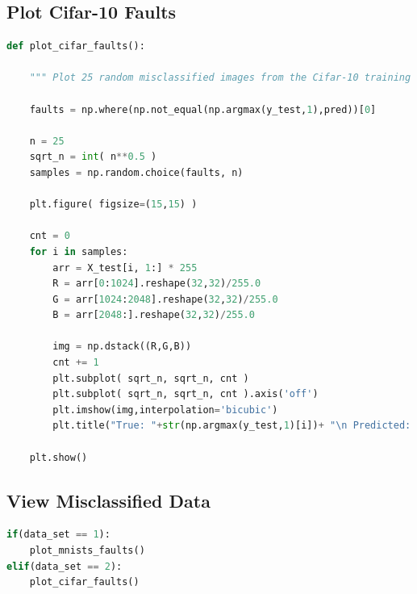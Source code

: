 \documentclass[11pt]{article}
\begin{document}
\subsection{Plot Cifar-10 Faults}
\begin{lstlisting}[language = Python]
def plot_cifar_faults():
    
    """ Plot 25 random misclassified images from the Cifar-10 training set. """  
    
    faults = np.where(np.not_equal(np.argmax(y_test,1),pred))[0]

    n = 25
    sqrt_n = int( n**0.5 )
    samples = np.random.choice(faults, n)

    plt.figure( figsize=(15,15) )

    cnt = 0
    for i in samples:
        arr = X_test[i, 1:] * 255
        R = arr[0:1024].reshape(32,32)/255.0
        G = arr[1024:2048].reshape(32,32)/255.0
        B = arr[2048:].reshape(32,32)/255.0

        img = np.dstack((R,G,B))
        cnt += 1
        plt.subplot( sqrt_n, sqrt_n, cnt )
        plt.subplot( sqrt_n, sqrt_n, cnt ).axis('off')
        plt.imshow(img,interpolation='bicubic')
        plt.title("True: "+str(np.argmax(y_test,1)[i])+ "\n Predicted: "+ str(pred[i]))

    plt.show()
\end{lstlisting}
\hfill
\hfill


\subsection{View Misclassified Data}

\begin{lstlisting}[language = Python]
if(data_set == 1):
    plot_mnists_faults()
elif(data_set == 2):
    plot_cifar_faults()
\end{lstlisting}
\end{document}
